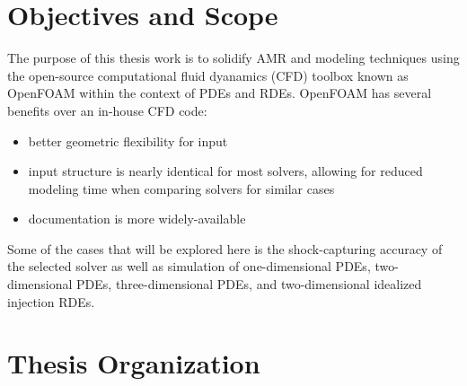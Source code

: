 \section{Objectives and Scope}
The purpose of this thesis work is to solidify AMR and modeling techniques using the open-source computational fluid dyanamics (CFD) toolbox known as OpenFOAM within the context of PDEs and RDEs. OpenFOAM has several benefits over an in-house CFD code:

\begin{itemize}
    \item better geometric flexibility for input 
    \item input structure is nearly identical for most solvers, allowing for reduced modeling time when comparing solvers for similar cases
    \item documentation is more widely-available
\end{itemize}

\noindent Some of the cases that will be explored here is the shock-capturing accuracy of the selected solver as well as simulation of one-dimensional PDEs, two-dimensional PDEs, three-dimensional PDEs, and two-dimensional idealized injection RDEs.


\section{Thesis Organization}
